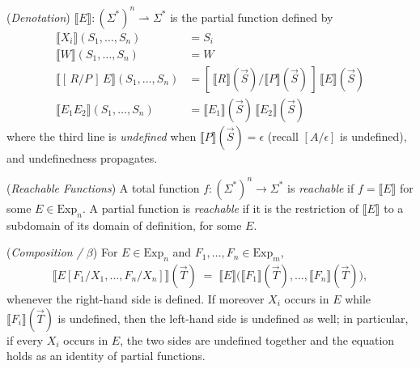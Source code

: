 \documentclass[runningheads,envcountsect]{llncs}
\begin{document}
\begin{definition}
    (\emph{Denotation})
    \label{def:den}
    $\llbracket E \rrbracket : (\Sigma^*)^n \rightharpoonup \Sigma^*$ is the partial function defined by
    \begin{align}
        \llbracket X_i \rrbracket(S_1, \dots, S_n) & = S_i \\
        \llbracket W \rrbracket(S_1, \dots, S_n) & = W \\
        \llbracket [\,R/P\,]\,E \rrbracket(S_1, \dots, S_n) & = [\,\llbracket R \rrbracket(\vec S)/\llbracket P \rrbracket(\vec S)\,]\,\llbracket E \rrbracket(\vec S) \\
        \llbracket E_1 E_2 \rrbracket(S_1, \dots, S_n) & = \llbracket E_1 \rrbracket(\vec S)\,\llbracket E_2 \rrbracket(\vec S)
    \end{align}
    where the third line is \emph{undefined} when $\llbracket P \rrbracket(\vec S) = \epsilon$ (recall $[A/\epsilon]$ is undefined), and undefinedness propagates.
\end{definition}

\begin{definition}
    (\emph{Reachable Functions})
    \label{def:reachable}
    A total function $f : (\Sigma^*)^n \rightarrow \Sigma^*$ is \emph{reachable} if $f = \llbracket E \rrbracket$ for some $E \in \mathrm{Exp}_n$. A partial function is \emph{reachable} if it is the restriction of $\llbracket E \rrbracket$ to a subdomain of its domain of definition, for some $E$.
\end{definition}

\begin{lemma}
    (\emph{Composition / $\beta$})
    \label{lem:beta}
    For $E \in \mathrm{Exp}_n$ and $F_1, \dots, F_n \in \mathrm{Exp}_m$,
    \begin{align}
        \llbracket E[F_1/X_1, \dots, F_n/X_n] \rrbracket(\vec T) \;=\; \llbracket E \rrbracket\big(\llbracket F_1 \rrbracket(\vec T), \dots, \llbracket F_n \rrbracket(\vec T)\big),
    \end{align}
    whenever the right-hand side is defined. If moreover $X_i$ occurs in $E$ while $\llbracket F_i \rrbracket(\vec T)$ is undefined, then the left-hand side is undefined as well; in particular, if every $X_i$ occurs in $E$, the two sides are undefined together and the equation holds as an identity of partial functions.
\end{lemma}
\end{document}
